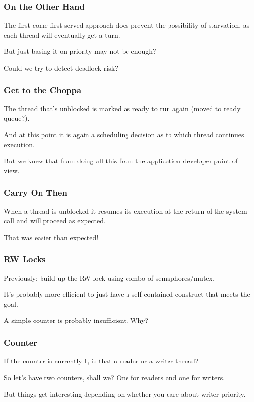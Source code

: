 \begin{frame}
\frametitle{On the Other Hand}

The first-come-first-served approach does prevent the possibility of starvation, as each thread will eventually get a turn.

But just basing it on priority may not be enough?

Could we try to detect deadlock risk?

\end{frame}

\begin{frame}
\frametitle{Get to the Choppa}

The thread that's unblocked is marked as ready to run again (moved to ready queue?). 

And at this point it is again a scheduling decision as to which thread continues execution. 

But we knew that from doing all this from the application developer point of view.

\end{frame}

\begin{frame}
\frametitle{Carry On Then}

When a thread is unblocked it resumes its execution at the return of the system call and will proceed as expected.

That was easier than expected!

\end{frame}

\begin{frame}
\frametitle{RW Locks}

Previously: build up the RW lock using combo of semaphores/mutex.


It's probably more efficient to just have a self-contained construct that meets the goal.

A simple counter is probably insufficient. Why?

\end{frame}

\begin{frame}
\frametitle{Counter}

If the counter is currently 1, is that a reader or a writer thread?

So let's have two counters, shall we? One for readers and one for writers.

But things get interesting depending on whether you care about writer priority.

\end{frame}

